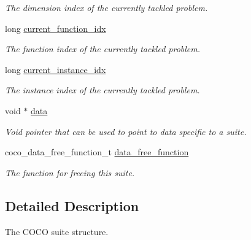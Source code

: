 \begin{DoxyCompactItemize}
\begin{DoxyCompactList}\small\item\em The dimension index of the currently tackled problem. \end{DoxyCompactList}\item 
long \hyperlink{structcoco__suite__s_a79a44d2ee88254a293b3b8063cada98a}{current\+\_\+function\+\_\+idx}\hypertarget{structcoco__suite__s_a79a44d2ee88254a293b3b8063cada98a}{}\label{structcoco__suite__s_a79a44d2ee88254a293b3b8063cada98a}

\begin{DoxyCompactList}\small\item\em The function index of the currently tackled problem. \end{DoxyCompactList}\item 
long \hyperlink{structcoco__suite__s_a53896248e622411067bf0698a246cd41}{current\+\_\+instance\+\_\+idx}\hypertarget{structcoco__suite__s_a53896248e622411067bf0698a246cd41}{}\label{structcoco__suite__s_a53896248e622411067bf0698a246cd41}

\begin{DoxyCompactList}\small\item\em The instance index of the currently tackled problem. \end{DoxyCompactList}\item 
void $\ast$ \hyperlink{structcoco__suite__s_a32f0f6070fa98bd49483c0747c5e7300}{data}\hypertarget{structcoco__suite__s_a32f0f6070fa98bd49483c0747c5e7300}{}\label{structcoco__suite__s_a32f0f6070fa98bd49483c0747c5e7300}

\begin{DoxyCompactList}\small\item\em Void pointer that can be used to point to data specific to a suite. \end{DoxyCompactList}\item 
coco\+\_\+data\+\_\+free\+\_\+function\+\_\+t \hyperlink{structcoco__suite__s_a2b79afbcfbcadee1cd05cc5a76fbbb3e}{data\+\_\+free\+\_\+function}\hypertarget{structcoco__suite__s_a2b79afbcfbcadee1cd05cc5a76fbbb3e}{}\label{structcoco__suite__s_a2b79afbcfbcadee1cd05cc5a76fbbb3e}

\begin{DoxyCompactList}\small\item\em The function for freeing this suite. \end{DoxyCompactList}\end{DoxyCompactItemize}


\subsection{Detailed Description}
The C\+O\+CO suite structure. 

